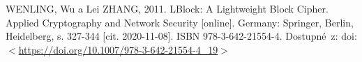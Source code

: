 \begin{thebibliography}{99}
    \label{source:lblock}
    WENLING, Wu a Lei ZHANG, 
    2011.
    LBlock: A Lightweight Block Cipher. Applied Cryptography and Network Security 
    [online]. 
    Germany: Springer, Berlin, Heidelberg, 
    s. 327-344 
    [cit. 2020-11-08]. 
    ISBN 978-3-642-21554-4. 
    Dostupné~z: doi: \(<\)\url{https://doi.org/10.1007/978-3-642-21554-4_19}\(>\)

\end{thebibliography}


%
%
%
